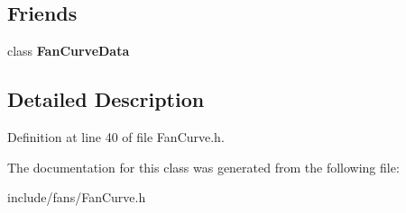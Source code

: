 \subsection*{Friends}
\begin{DoxyCompactItemize}
\item 
\mbox{\label{class_fan_curve_data_1_1_base_curve_a84779ae1f4b93a96435593980fe1445b}} 
class {\bfseries Fan\+Curve\+Data}
\end{DoxyCompactItemize}


\subsection{Detailed Description}


Definition at line 40 of file Fan\+Curve.\+h.



The documentation for this class was generated from the following file\+:\begin{DoxyCompactItemize}
\item 
include/fans/Fan\+Curve.\+h\end{DoxyCompactItemize}
